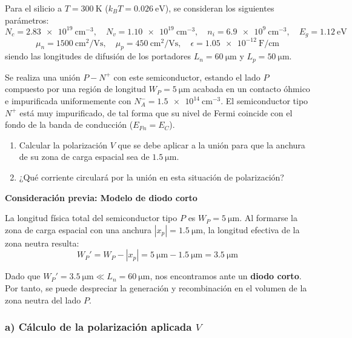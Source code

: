 \newpage
\seccionproblemas
\begin{problema}
Para el silicio a $T = \SI{300}{\kelvin}$ ($k_B T = \SI{0.026}{\eV}$), se consideran los siguientes parámetros:
\[
N_c = \SI{2.83e19}{\cm^{-3}}, \quad N_v = \SI{1.10e19}{\cm^{-3}}, \quad n_i = \SI{6.9e9}{\cm^{-3}}, \quad E_g = \SI{1.12}{\eV}
\]
\[
\mu_n = \SI{1500}{\cm^2/\V\second}, \quad \mu_p = \SI{450}{\cm^2/\V\second}, \quad \epsilon = \SI{1.05e-12}{\farad\per\cm}
\]
siendo las longitudes de difusión de los portadores $L_n = \SI{60}{\um}$ y $L_p = \SI{50}{\um}$.

Se realiza una unión $P-N^+$ con este semiconductor, estando el lado $P$ compuesto por una región de longitud $W_P = \SI{5}{\um}$ acabada en un contacto óhmico e impurificada uniformemente con $N_A^- = \SI{1.5e14}{\cm^{-3}}$. El semiconductor tipo $N^+$ está muy impurificado, de tal forma que su nivel de Fermi coincide con el fondo de la banda de conducción ($E_{Fn} = E_C$).

\begin{enumerate}[label=\alph*)]
    \item Calcular la polarización $V$ que se debe aplicar a la unión para que la anchura de su zona de carga espacial sea de $\SI{1.5}{\um}$.
    \item ¿Qué corriente circulará por la unión en esta situación de polarización?
\end{enumerate}
\tcblower
\textbf{Consideración previa: Modelo de diodo corto}

La longitud física total del semiconductor tipo $P$ es $W_P = \SI{5}{\um}$. Al formarse la zona de carga espacial con una anchura $|x_p| = \SI{1.5}{\um}$, la longitud efectiva de la zona neutra resulta:
\[
W_P' = W_P - |x_p| = \SI{5}{\um} - \SI{1.5}{\um} = \SI{3.5}{\um}
\]

Dado que $W_P' = \SI{3.5}{\um} \ll L_n = \SI{60}{\um}$, nos encontramos ante un \textbf{diodo corto}. Por tanto, se puede despreciar la generación y recombinación en el volumen de la zona neutra del lado $P$.

\subsubsection*{a) Cálculo de la polarización aplicada $V$}


\end{problema}
